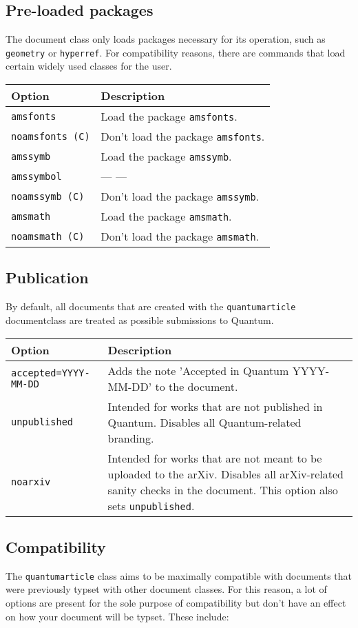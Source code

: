 \documentclass[a4paper,noarxiv,onecolumn]{quantumarticle}
\newcommand*{\ditto}{--- \raisebox{-0.5ex}{''} ---}
\newenvironment{options}
	{\medskip\noindent\begin{longtable}{p{.25\columnwidth}p{.694\columnwidth}}
	\textsf{Option} & \textsf{Description} \\
	\midrule
	}
	{\bottomrule\end{longtable}}
\newcommand{\option}[2]{
	\small\texttt{#1} & {\small#2} \\
}
\newcommand{\compatibilityoption}[2]{
	\small\texttt{#1 (C)} & {\small #2} \\
}
\begin{document}
	\subsection{Pre-loaded packages}
	The document class only loads packages necessary for its operation, such as \texttt{geometry} or \texttt{hyperref}. For compatibility reasons, there are commands that load certain widely used classes for the user.
	
	\begin{options}
		\option{amsfonts}{%
			Load the package \texttt{amsfonts}.
		}
		\compatibilityoption{noamsfonts}{%
			Don't load the package \texttt{amsfonts}.
		}
		\option{amssymb}{%
			Load the package \texttt{amssymb}.
		}
		\option{amssymbol}{%
			\ditto
		}
		\compatibilityoption{noamssymb}{%
			Don't load the package \texttt{amssymb}.
		}
		\option{amsmath}{%
			Load the package \texttt{amsmath}.
		}
		\compatibilityoption{noamsmath}{%
			Don't load the package \texttt{amsmath}.
		}
	\end{options}

	\subsection{Publication}
	By default, all documents that are created with the \texttt{quantumarticle} documentclass are treated as possible submissions to Quantum. 
	
	\begin{options}
		\option{accepted=YYYY-MM-DD}{%
			Adds the note 'Accepted in Quantum YYYY-MM-DD' to the document.
		}
		\option{unpublished}{%
			Intended for works that are not published in Quantum. Disables all Quantum-related branding.
		}
		\option{noarxiv}{%
			Intended for works that are not meant to be uploaded to the arXiv. Disables all arXiv-related sanity checks in the document. This option also sets \texttt{unpublished}.
		}
	\end{options}

	\subsection{Compatibility}
	The \texttt{quantumarticle} class aims to be maximally compatible with documents that were previously typset with other document classes. For this reason, a lot of options are present for the sole purpose of compatibility but don't have an effect on how your document will be typset. These include:
	
\end{document}
